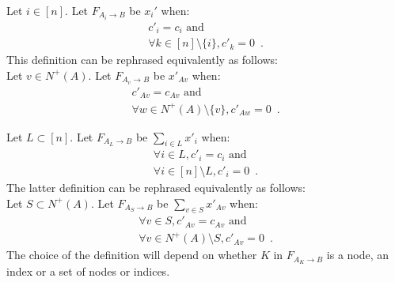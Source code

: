 \begin{definition} \ \\
  Let $i \in [n]$. Let $F_{A_i \rightarrow B}$ be $x_i'$ when:
  \begin{equation*}
  \begin{gathered}
    c'_i = c_i \mbox{ and} \\
    \forall k \in [n] \setminus \{i\}, c'_k = 0 \enspace.
  \end{gathered}
  \end{equation*}
  This definition can be rephrased equivalently as follows: \\
  Let $v \in N^{+}\left(A\right)$. Let $F_{A_v \rightarrow B}$ be $x'_{Av}$ when:
  \begin{equation*}
  \begin{gathered}
    c'_{Av} = c_{Av} \mbox{ and} \\
    \forall w \in N^{+}\left(A\right) \setminus \{v\}, c'_{Aw} = 0 \enspace.
  \end{gathered}
  \end{equation*}

  Let $L \subset [n]$. Let $F_{A_L \rightarrow B}$ be $\sum\limits_{i \in L}x'_i$ when:
  \begin{equation*}
  \begin{gathered}
    \forall i \in L, c'_i = c_i \mbox{ and} \\
    \forall i \in [n] \setminus L, c'_i = 0 \enspace.
  \end{gathered}
  \end{equation*}
  The latter definition can be rephrased equivalently as follows: \\
  Let $S \subset N^{+}\left(A\right)$. Let $F_{A_S \rightarrow B}$ be
  $\sum\limits_{v \in S}x'_{Av}$ when:
  \begin{equation*}
  \begin{gathered}
    \forall v \in S, c'_{Av} = c_{Av} \mbox{ and} \\
    \forall v \in N^{+}\left(A\right) \setminus S, c'_{Av} = 0 \enspace.
  \end{gathered}
  \end{equation*}
  The choice of the definition will depend on whether $K$ in $F_{A_K \rightarrow B}$ is a node, an index or a set of nodes
  or indices.
\end{definition}
